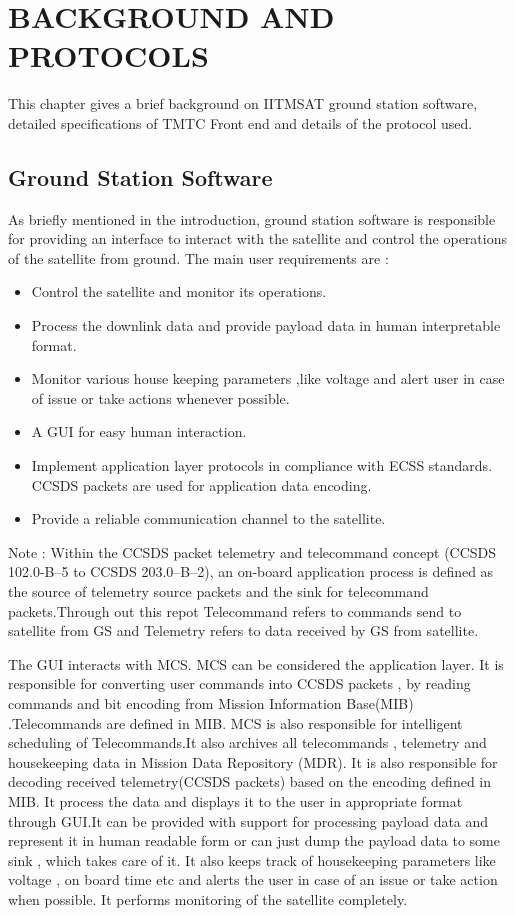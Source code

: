 \documentclass[BTech]{iitmdiss}
\begin{document}
 \chapter{BACKGROUND AND PROTOCOLS}
 \label{chap:background}
This chapter gives a brief background on IITMSAT ground station software, detailed specifications of TMTC Front end and details of the protocol used.
\section{Ground Station Software}
As briefly mentioned in the introduction, ground station software is responsible for providing an interface to interact with the satellite and control the operations of the satellite from ground. The main user requirements are :
\begin{itemize}
\item Control the satellite and monitor its operations.
\item Process the downlink data and provide payload data in human interpretable format.
\item Monitor various house keeping parameters ,like voltage and alert user in case of issue or take actions whenever possible.
\item A GUI for easy human interaction.
\item Implement application layer protocols in compliance with ECSS standards. CCSDS packets are used for application data encoding. 
\item Provide a reliable communication channel to the satellite. 
\end{itemize}

Note : Within the CCSDS packet telemetry and telecommand concept
(CCSDS 102.0-B--5 to CCSDS 203.0--B--2), an on-board application process is defined as the source of telemetry source packets and the sink for telecommand packets.Through out this repot Telecommand refers to commands send to satellite from GS and Telemetry refers to data received by GS from satellite.

The GUI interacts with MCS. MCS can be considered the application layer. It is responsible for converting user commands into CCSDS packets , by reading commands and bit encoding from Mission Information Base(MIB) .Telecommands are defined in MIB.  MCS is also responsible for intelligent scheduling of Telecommands.It also archives all telecommands , telemetry and housekeeping data  in Mission Data Repository (MDR).
It is also responsible for decoding received telemetry(CCSDS packets) based on the encoding defined in MIB. It process the data  and displays it to the user in appropriate format through GUI.It can  be provided with support for processing payload data and represent it in human readable form or can just dump the payload data to some sink , which takes care of it.  It also keeps track of housekeeping parameters like voltage , on board time etc and alerts the user in case of an issue or take action when possible. It performs monitoring of the satellite completely. 
\end{document}
